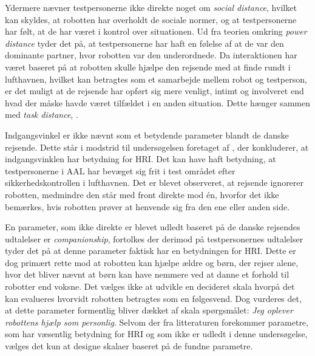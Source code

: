 Ydermere nævner testpersonerne ikke direkte noget om \textit{social distance}, hvilket kan skyldes, at robotten har overholdt de sociale normer, og at testpersonerne har følt, at de har været i kontrol over situationen. Ud fra teorien omkring \textit{power distance} tyder det på, at testpersonerne har haft en følelse af at de var den dominante partner, hvor robotten var den underordnede. Da interaktionen har været baseret på at robotten skulle hjælpe den rejsende med at finde rundt i lufthavnen, hvilket kan betragtes som et samarbejde mellem robot og testperson, er det muligt at de rejsende har opført sig mere venligt, intimt og involveret end hvad der måske havde været tilfældet i en anden situation. Dette hænger sammen med \textit{task distance}, \parencite[s. 784]{PDF:HowSocialDistanceShapesHRI}. 

Indgangsvinkel er ikke nævnt som et betydende parameter blandt de danske rejsende. Dette står i modstrid til undersøgelsen foretaget af \textcite{PDF:HowMayIServeYou}, der konkluderer, at indgangsvinklen har betydning for HRI. Det kan have haft betydning, at testpersonerne i AAL har bevæget sig frit i test området efter sikkerhedskontrollen i lufthavnen. Det er blevet observeret, at rejsende ignorerer robotten, medmindre den står med front direkte mod én, hvorfor det ikke bemærkes, hvis robotten prøver at henvende sig fra den ene eller anden side. 

En parameter, som ikke direkte er blevet udledt baseret på de danske rejsendes udtalelser er \textit{companionship}, fortolkes der derimod på testpersonernes udtalelser tyder det på at denne parameter faktisk har en betydningen for HRI. Dette er dog primært rette mod at robotten kan hjælpe ældre og børn, der rejser alene, hvor det bliver nævnt at børn kan have nemmere ved at danne et forhold til robotter end voksne. Det vælges ikke at udvikle en decideret skala hvorpå det kan evalueres hvorvidt robotten betragtes som en følgesvend. Dog vurderes det, at dette parameter formentlig bliver dækket af skala spørgsmålet: \textit{Jeg oplever robottens hjælp som personlig}. \blankline
%
Selvom der fra litteraturen forekommer parametre, som har væsentlig betydning for HRI og som ikke er udledt i denne undersøgelse, vælges det kun at designe skalaer baseret på de fundne parametre. 
